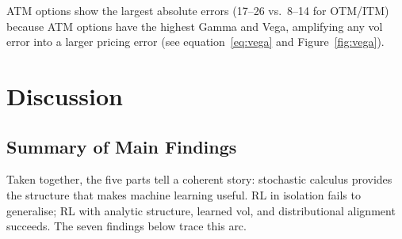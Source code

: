 \documentclass[12pt,a4paper]{article}
\begin{document}
ATM options show the largest absolute errors (17--26 vs.\ 8--14 for OTM/ITM)
because ATM options have the highest Gamma and Vega, amplifying any vol error
into a larger pricing error (see equation~\eqref{eq:vega} and Figure~\ref{fig:vega}).

\section{Discussion}
\label{sec:discussion}

\subsection{Summary of Main Findings}

Taken together, the five parts tell a coherent story: stochastic calculus
provides the structure that makes machine learning useful.  RL in isolation
fails to generalise; RL with analytic structure, learned vol, and distributional
alignment succeeds.  The seven findings below trace this arc.
\end{document}
